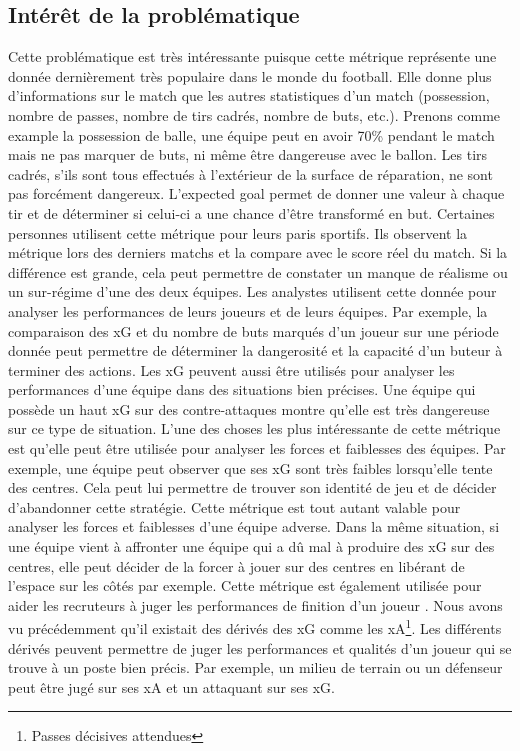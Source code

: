 \documentclass[12pt]{article}
\begin{document}
\subsection{Intérêt de la problématique}
Cette problématique est très intéressante puisque cette métrique représente une donnée dernièrement très populaire dans le monde du football. Elle donne plus d'informations sur le match que les autres statistiques d'un match (possession, nombre de passes, nombre de tirs cadrés, nombre de buts, etc.). 
Prenons comme example la possession de balle, une équipe peut en avoir 70\% pendant le match mais ne pas marquer de buts, ni même être dangereuse avec le ballon. 
Les tirs cadrés, s'ils sont tous effectués à l'extérieur de la surface de réparation, ne sont pas forcément dangereux. 
L'expected goal permet de donner une valeur à chaque tir et de déterminer si celui-ci a une chance d'être transformé en but.
\newline \newline
Certaines personnes utilisent cette métrique pour leurs paris sportifs. 
Ils observent la métrique lors des derniers matchs et la compare avec le score réel du match. 
Si la différence est grande, cela peut permettre de constater un manque de réalisme ou un sur-régime d'une des deux équipes. \cite{tennerelBienUtiliserExpected2022a}
\newline \newline
Les analystes utilisent cette donnée pour analyser les performances de leurs joueurs et de leurs équipes. Par exemple, la comparaison des xG et du nombre de buts marqués d'un joueur sur une période donnée peut permettre de déterminer la dangerosité et la capacité d'un buteur à terminer des actions. \cite{pettyWhatExpectedGoals2018a}
Les xG peuvent aussi être utilisés pour analyser les performances d'une équipe dans des situations bien précises. Une équipe qui possède un haut xG sur des contre-attaques montre qu'elle est très dangereuse sur ce type de situation. \cite{XGExplainedFBrefa}
L'une des choses les plus intéressante de cette métrique est qu'elle peut être utilisée pour analyser les forces et faiblesses des équipes. Par exemple, une équipe peut observer que ses xG sont très faibles lorsqu'elle tente des centres. Cela peut lui permettre de trouver son identité de jeu et de décider d'abandonner cette stratégie. Cette métrique est tout autant valable pour analyser les forces et faiblesses d'une équipe adverse. 
Dans la même situation, si une équipe vient à affronter une équipe qui a dû mal à produire des xG sur des centres, elle peut décider de la forcer à jouer sur des centres en libérant de l'espace sur les côtés par exemple.
\newline \newline
Cette métrique est également utilisée pour aider les recruteurs à juger les performances de finition d'un joueur \cite{garratt-stanleyWhatExpectedGoals2022}. Nous avons vu précédemment qu'il existait des dérivés des xG comme les xA\footnote{Passes décisives attendues}. 
Les différents dérivés peuvent permettre de juger les performances et qualités d'un joueur qui se trouve à un poste bien précis. 
Par exemple, un milieu de terrain ou un défenseur peut être jugé sur ses xA et un attaquant sur ses xG.
\end{document}
